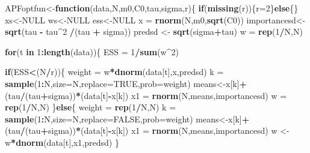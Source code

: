 \documentclass[
]{book}
\newenvironment{Shaded}{\begin{snugshade}}{\end{snugshade}}
\newcommand{\ControlFlowTok}[1]{\textcolor[rgb]{0.13,0.29,0.53}{\textbf{#1}}}
\newcommand{\DataTypeTok}[1]{\textcolor[rgb]{0.13,0.29,0.53}{#1}}
\newcommand{\DecValTok}[1]{\textcolor[rgb]{0.00,0.00,0.81}{#1}}
\newcommand{\KeywordTok}[1]{\textcolor[rgb]{0.13,0.29,0.53}{\textbf{#1}}}
\newcommand{\NormalTok}[1]{#1}
\newcommand{\OperatorTok}[1]{\textcolor[rgb]{0.81,0.36,0.00}{\textbf{#1}}}
\newcommand{\OtherTok}[1]{\textcolor[rgb]{0.56,0.35,0.01}{#1}}
\newcommand{\StringTok}[1]{\textcolor[rgb]{0.31,0.60,0.02}{#1}}
\theoremstyle{break}
\theoremstyle{nonumberplain}
\begin{document}
\begin{Shaded}
\begin{Highlighting}[]
\NormalTok{APFoptfun<-}\ControlFlowTok{function}\NormalTok{(data,N,m0,C0,tau,sigma,r)\{}
  \ControlFlowTok{if}\NormalTok{(}\KeywordTok{missing}\NormalTok{(r))\{r=}\DecValTok{2}\NormalTok{\}}\ControlFlowTok{else}\NormalTok{\{\}}
\NormalTok{  xs<-}\OtherTok{NULL}
\NormalTok{  ws<-}\OtherTok{NULL}
\NormalTok{  ess<-}\OtherTok{NULL}
\NormalTok{  x  =}\StringTok{ }\KeywordTok{rnorm}\NormalTok{(N,m0,}\KeywordTok{sqrt}\NormalTok{(C0))}
\NormalTok{  importancesd<-}\KeywordTok{sqrt}\NormalTok{(tau }\OperatorTok{-}\StringTok{ }\NormalTok{tau}\OperatorTok{^}\DecValTok{2} \OperatorTok{/}\NormalTok{(tau }\OperatorTok{+}\StringTok{ }\NormalTok{sigma))}
\NormalTok{  predsd <-}\StringTok{ }\KeywordTok{sqrt}\NormalTok{(sigma}\OperatorTok{+}\NormalTok{tau)}
\NormalTok{  w  =}\StringTok{ }\KeywordTok{rep}\NormalTok{(}\DecValTok{1}\OperatorTok{/}\NormalTok{N,N)}
  
  \ControlFlowTok{for}\NormalTok{(t }\ControlFlowTok{in} \DecValTok{1}\OperatorTok{:}\KeywordTok{length}\NormalTok{(data))\{}
\NormalTok{    ESS  =}\StringTok{ }\DecValTok{1}\OperatorTok{/}\KeywordTok{sum}\NormalTok{(w}\OperatorTok{^}\DecValTok{2}\NormalTok{)}
    
    \ControlFlowTok{if}\NormalTok{(ESS}\OperatorTok{<}\NormalTok{(N}\OperatorTok{/}\NormalTok{r))\{}
\NormalTok{    weight =}\StringTok{ }\NormalTok{w}\OperatorTok{*}\KeywordTok{dnorm}\NormalTok{(data[t],x,predsd)}
\NormalTok{    k   =}\StringTok{ }\KeywordTok{sample}\NormalTok{(}\DecValTok{1}\OperatorTok{:}\NormalTok{N,}\DataTypeTok{size=}\NormalTok{N,}\DataTypeTok{replace=}\OtherTok{TRUE}\NormalTok{,}\DataTypeTok{prob=}\NormalTok{weight)}
\NormalTok{    means<-x[k]}\OperatorTok{+}\NormalTok{(tau}\OperatorTok{/}\NormalTok{(tau}\OperatorTok{+}\NormalTok{sigma))}\OperatorTok{*}\NormalTok{(data[t]}\OperatorTok{-}\NormalTok{x[k])}
\NormalTok{    x1   =}\StringTok{ }\KeywordTok{rnorm}\NormalTok{(N,means,importancesd)}
\NormalTok{    w   =}\StringTok{ }\KeywordTok{rep}\NormalTok{(}\DecValTok{1}\OperatorTok{/}\NormalTok{N,N)}
\NormalTok{    \}}\ControlFlowTok{else}\NormalTok{\{}
\NormalTok{    weight =}\StringTok{ }\KeywordTok{rep}\NormalTok{(}\DecValTok{1}\OperatorTok{/}\NormalTok{N,N)}
\NormalTok{    k   =}\StringTok{ }\KeywordTok{sample}\NormalTok{(}\DecValTok{1}\OperatorTok{:}\NormalTok{N,}\DataTypeTok{size=}\NormalTok{N,}\DataTypeTok{replace=}\OtherTok{FALSE}\NormalTok{,}\DataTypeTok{prob=}\NormalTok{weight)}
\NormalTok{    means<-x[k]}\OperatorTok{+}\NormalTok{(tau}\OperatorTok{/}\NormalTok{(tau}\OperatorTok{+}\NormalTok{sigma))}\OperatorTok{*}\NormalTok{(data[t]}\OperatorTok{-}\NormalTok{x[k])}
\NormalTok{    x1   =}\StringTok{ }\KeywordTok{rnorm}\NormalTok{(N,means,importancesd)}
\NormalTok{    w   <-}\StringTok{  }\NormalTok{w}\OperatorTok{*}\KeywordTok{dnorm}\NormalTok{(data[t],x1,predsd)}
\NormalTok{    \}}
    

\end{Highlighting}
\end{Shaded}
\end{document}
